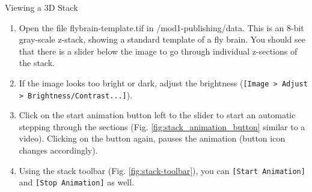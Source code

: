 \begin{taskbox}{Viewing a 3D Stack}

\begin{enumerate}
	\item Open the file flybrain-template.tif in /mod1-publishing/data. This is an 8-bit gray-scale z-stack, showing a standard template of a fly brain. You should see that there is a slider below the image to go through individual z-sections of the stack. 
	\item If the image looks too bright or dark, adjust the brightness (\texttt{[Image > Adjust > Brightness/Contrast...]}).
	\item Click on the start animation button left to the slider to start an automatic stepping through the sections (Fig. \ref{fig:stack_animation_button} similar to a video). Clicking on the button again, pauses the animation (button icon changes accordingly).
	
	\begin{minipage}[t]{\linewidth}
		\begin{center}
		\medskip
		\label{fig:stack-animation-button}
		\end{center}
	\end{minipage}
	
	\item Using the stack toolbar (Fig. \ref{fig:stack-toolbar}), you can \texttt{[Start Animation]} and \texttt{[Stop Animation]} as well.
	
	\begin{minipage}[t]{\linewidth}
		\begin{center}
		\medskip
		\label{fig:stack-toolbar}
		\end{center}
	\end{minipage}
	

\end{enumerate}
\end{taskbox}
